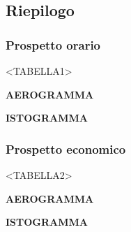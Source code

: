 \subsection{Riepilogo}

\subsubsection{Prospetto orario}

<TABELLA1>


\textbf{AEROGRAMMA}


\textbf{ISTOGRAMMA}

\subsubsection{Prospetto economico}

<TABELLA2>


\textbf{AEROGRAMMA}


\textbf{ISTOGRAMMA}

